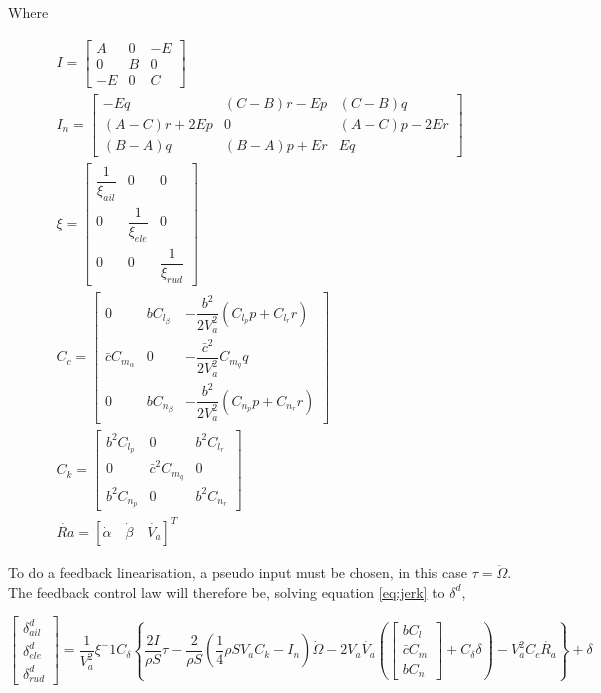Where

\begin{gather*}
I=
\begin{bmatrix}
A & 0 & -E\\
0 & B & 0\\
-E & 0 & C
\end{bmatrix}\\
I_n=
\begin{bmatrix}
-Eq & (C-B)r-Ep & (C-B)q\\
(A-C)r+2Ep & 0 & (A-C)p-2Er\\
(B-A)q & (B-A)p+Er & Eq
\end{bmatrix}\\
\xi=
\begin{bmatrix}
\dfrac{1}{\xi_{ail}} & 0 & 0\\
0 & \dfrac{1}{\xi_{ele}} & 0\\
0 & 0 & \dfrac{1}{\xi_{rud}}
\end{bmatrix}\\
C_c=
\begin{bmatrix}
0 & bC_{l_\beta} & -\dfrac{b^2}{2V_a^2}(C_{l_p}p+C_{l_r}r)\\
\bar{c}C_{m_\alpha} & 0 & -\dfrac{\bar{c}^2}{2V_a^2}C_{m_q}q\\
0 & bC_{n_\beta} & -\dfrac{b^2}{2V_a^2}(C_{n_p}p+C_{n_r}r)
\end{bmatrix}\\
C_k=
\begin{bmatrix}
b^2C_{l_p} & 0 & b^2C_{l_r}\\
0 & \bar{c}^2C_{m_q} & 0\\
b^2C_{n_p} & 0 & b^2C_{n_r}
\end{bmatrix}\\
\dot{Ra} =  [\dot{\alpha} \quad \dot{\beta} \quad \dot{V_a}]^T
\end{gather*}

To do a feedback linearisation, a pseudo input must be chosen, in this case $\tau = \ddot{\Omega}$. The feedback control law will therefore be, solving equation \ref{eq:jerk} to $\delta^d$,

\begin{equation}
\begin{bmatrix}
\delta^d_{ail}\\
\delta^d_{ele}\\
\delta^d_{rud}
\end{bmatrix}
=\dfrac{1}{V_a^2}\xi^-1C_\delta\left\lbrace\dfrac{2I}{\rho S}\tau - \dfrac{2}{\rho S}(\dfrac{1}{4}\rho S V_aC_k - I_n)\dot{\Omega} -2V_a\dot{V_a} \left(
\begin{bmatrix}
bC_l\\
\bar{c}C_m\\
bC_n
\end{bmatrix}
+ C_\delta \delta\right)-V_a^2C_c\dot{R_a} \right\rbrace+ \delta
\label{eq:control_law}
\end{equation}


